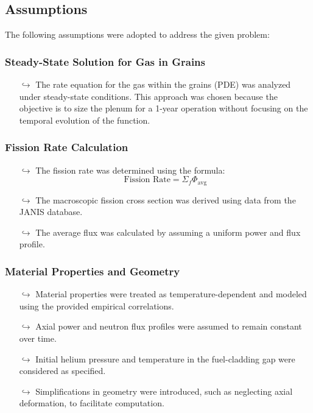 \subsection{Assumptions}
The following assumptions were adopted to address the given problem:

\subsubsection*{Steady-State Solution for Gas in Grains}
\begin{itemize}
    \item[$\hookrightarrow$] The rate equation for the gas within the grains (PDE) was analyzed under steady-state conditions. This approach was chosen because the objective is to size the plenum for a 1-year operation without focusing on the temporal evolution of the function.
\end{itemize}

\subsubsection*{Fission Rate Calculation}
\begin{itemize}
    \item[$\hookrightarrow$] The fission rate was determined using the formula:
    \begin{equation*}
        \text{Fission Rate} = \Sigma_f \Phi_{\text{avg}}  
    \end{equation*}
    \item[$\hookrightarrow$] The macroscopic fission cross section was derived using data from the JANIS database.
    \item[$\hookrightarrow$] The average flux was calculated by assuming a uniform power and flux profile.
\end{itemize}

\subsubsection*{Material Properties and Geometry}
\begin{itemize}
    \item[$\hookrightarrow$] Material properties were treated as temperature-dependent and modeled using the provided empirical correlations.
    \item[$\hookrightarrow$] Axial power and neutron flux profiles were assumed to remain constant over time.
    \item[$\hookrightarrow$] Initial helium pressure and temperature in the fuel-cladding gap were considered as specified.
    \item[$\hookrightarrow$] Simplifications in geometry were introduced, such as neglecting axial deformation, to facilitate computation.
\end{itemize}
